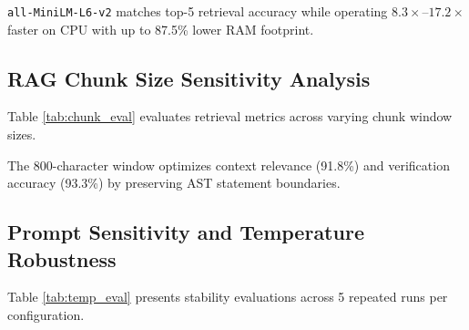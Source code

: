 \documentclass[conference]{IEEEtran}
\begin{document}
\texttt{all-MiniLM-L6-v2} matches top-5 retrieval accuracy while operating $8.3\times$--$17.2\times$ faster on CPU with up to 87.5\% lower RAM footprint.

\subsection{RAG Chunk Size Sensitivity Analysis}
Table \ref{tab:chunk_eval} evaluates retrieval metrics across varying chunk window sizes.

\begin{table}[htbp]
\caption{RAG Chunk Size Sensitivity Evaluation}
\label{tab:chunk_eval}
\centering
{}
\end{table}

The 800-character window optimizes context relevance (91.8\%) and verification accuracy (93.3\%) by preserving AST statement boundaries.

\subsection{Prompt Sensitivity and Temperature Robustness}
Table \ref{tab:temp_eval} presents stability evaluations across 5 repeated runs per configuration.
\end{document}

